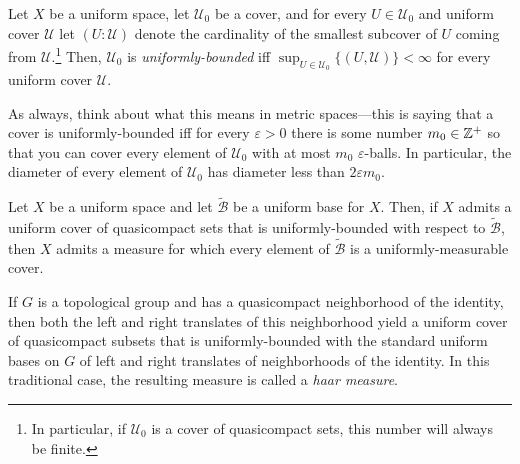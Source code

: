 \begin{dfn}\label{UniformlyBounded}
Let $X$ be a uniform space, let $\mathcal{U}_0$ be a cover, and for every $U\in \mathcal{U}_0$ and uniform cover $\mathcal{U}$ let $(U:\mathcal{U})$ denote the cardinality of the smallest subcover of $U$ coming from $\mathcal{U}$.\footnote{In particular, if $\mathcal{U}_0$ is a cover of quasicompact sets, this number will always be finite.}  Then, $\mathcal{U}_0$ is \emph{uniformly-bounded} iff $\sup _{U\in \mathcal{U}_0}\{ (U,\mathcal{U})\} <\infty$ for every uniform cover $\mathcal{U}$.
\begin{rmk}
As always, think about what this means in metric spaces---this is saying that a cover is uniformly-bounded iff for every $\varepsilon >0$ there is some number $m_0\in \mathbb{Z} ^+$ so that you can cover every element of $\mathcal{U}_0$ with at most $m_0$ $\varepsilon$-balls.  In particular, the diameter of every element of $\mathcal{U}_0$ has diameter less than $2\varepsilon m_0$.
\end{rmk}
\end{dfn}
\begin{thm}
Let $X$ be a uniform space and let $\widetilde{\mathcal{B}}$ be a uniform base for $X$.  Then, if $X$ admits a uniform cover of quasicompact sets that is uniformly-bounded with respect to $\widetilde{\mathcal{B}}$, then $X$ admits a measure for which every element of $\widetilde{\mathcal{B}}$ is a uniformly-measurable cover.
\begin{rmk}
If $G$ is a topological group and has a quasicompact neighborhood of the identity, then both the left and right translates of this neighborhood yield a uniform cover of quasicompact subsets that is uniformly-bounded with the standard uniform bases on $G$ of left and right translates of neighborhoods of the identity.  In this traditional case, the resulting measure is called a \emph{haar measure}.
\end{rmk}
\end{thm}